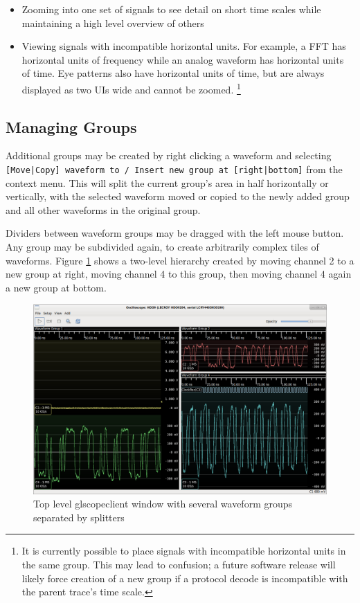 \documentclass[11pt]{article}
\newcommand{\menustyle}[1]{\texttt{#1}}
\begin{document}
\begin{itemize}
\item Zooming into one set of signals to see detail on short time scales while maintaining a high level overview of
others
\item Viewing signals with incompatible horizontal units. For example, a FFT has horizontal units of frequency while an
analog waveform has horizontal units of time. Eye patterns also have horizontal units of time, but are always displayed
as two UIs wide and cannot be zoomed.
\footnote
{
It is currently possible to place signals with incompatible horizontal units in the same group. This may lead to
confusion; a future software release will likely force creation of a new group if a protocol decode is incompatible
with the parent trace's time scale.
}
\end{itemize}

\subsection{Managing Groups}

Additional groups may be created by right clicking a waveform and selecting \menustyle{[Move|Copy] waveform to / Insert
new group at [right|bottom]} from the context menu. This will split the current group's area in half horizontally or
vertically, with the selected waveform moved or copied to the newly added group and all other waveforms in the original
group.

Dividers between waveform groups may be dragged with the left mouse button. Any group may be subdivided again, to
create arbitrarily complex tiles of waveforms. Figure \ref{multiple-groups} shows a two-level hierarchy created by
moving channel 2 to a new group at right, moving channel 4 to this group, then moving channel 4 again a new group at
bottom.

\begin{figure}[h]
\centering
\includegraphics[width=14cm]{images/multiple-groups.png}
\caption{Top level glscopeclient window with several waveform groups separated by splitters}
\label{multiple-groups}
\end{figure}
\end{document}
